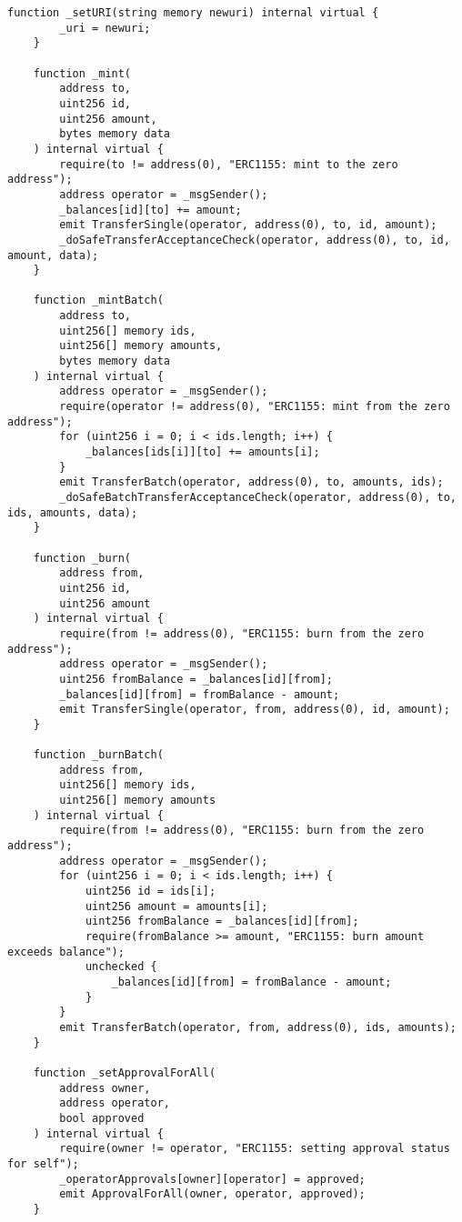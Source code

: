 \begin{lstlisting}[language=Solidity, style=solStyle]
    function _setURI(string memory newuri) internal virtual {
        _uri = newuri;
    }

    function _mint(
        address to,
        uint256 id,
        uint256 amount,
        bytes memory data
    ) internal virtual {
        require(to != address(0), "ERC1155: mint to the zero address");
        address operator = _msgSender();
        _balances[id][to] += amount;
        emit TransferSingle(operator, address(0), to, id, amount);
        _doSafeTransferAcceptanceCheck(operator, address(0), to, id, amount, data);
    }

    function _mintBatch(
        address to,
        uint256[] memory ids,
        uint256[] memory amounts,
        bytes memory data
    ) internal virtual {
        address operator = _msgSender();
        require(operator != address(0), "ERC1155: mint from the zero address");
        for (uint256 i = 0; i < ids.length; i++) {
            _balances[ids[i]][to] += amounts[i];
        }
        emit TransferBatch(operator, address(0), to, amounts, ids);
        _doSafeBatchTransferAcceptanceCheck(operator, address(0), to, ids, amounts, data);
    }

    function _burn(
        address from,
        uint256 id,
        uint256 amount
    ) internal virtual {
        require(from != address(0), "ERC1155: burn from the zero address");
        address operator = _msgSender();
        uint256 fromBalance = _balances[id][from];
        _balances[id][from] = fromBalance - amount;
        emit TransferSingle(operator, from, address(0), id, amount);
    }

    function _burnBatch(
        address from,
        uint256[] memory ids,
        uint256[] memory amounts
    ) internal virtual {
        require(from != address(0), "ERC1155: burn from the zero address");
        address operator = _msgSender();
        for (uint256 i = 0; i < ids.length; i++) {
            uint256 id = ids[i];
            uint256 amount = amounts[i];
            uint256 fromBalance = _balances[id][from];
            require(fromBalance >= amount, "ERC1155: burn amount exceeds balance");
            unchecked {
                _balances[id][from] = fromBalance - amount;
            }
        }
        emit TransferBatch(operator, from, address(0), ids, amounts);
    }

    function _setApprovalForAll(
        address owner,
        address operator,
        bool approved
    ) internal virtual {
        require(owner != operator, "ERC1155: setting approval status for self");
        _operatorApprovals[owner][operator] = approved;
        emit ApprovalForAll(owner, operator, approved);
    }


\end{lstlisting}
